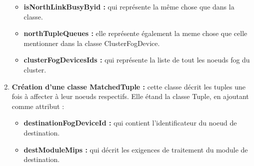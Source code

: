 \begin{enumerate}
\begin{itemize}
     \item \textbf{isNorthLinkBusyByid :} qui représente la même chose que dans la classe.
     \item \textbf{northTupleQueues :} elle représente également la meme chose que celle mentionner dans la classe ClusterFogDevice.
     \item \textbf{clusterFogDevicesIds :} qui représente la liste de tout les noeuds fog du cluster.
     \end{itemize}
     \item \textbf{Création d’une classe MatchedTuple :} cette classe décrit  les tuples une fois à affecter à leur noeuds respectifs. Elle étand la classe Tuple, en ajoutant comme attribut :
     \begin{itemize}
         \item \textbf{destinationFogDeviceId :} qui contient l’identificateur du noeud de destination.
         \item \textbf{destModuleMips :} qui décrit les exigences de traitement du module de destination.
     \end{itemize}
\end{enumerate}
